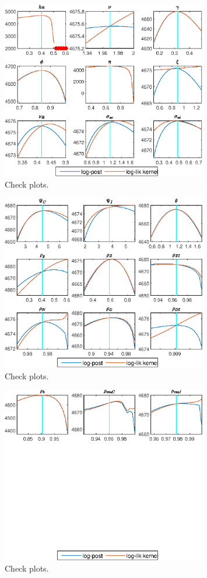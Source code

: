 \begin{figure}[H]
\centering 
\includegraphics[width=0.80\textwidth]{BRS_sectoral/graphs/BRS_sectoral_CheckPlots3}
\caption{Check plots.}\label{Fig:CheckPlots:3}
\end{figure}
 
\begin{figure}[H]
\centering 
\includegraphics[width=0.80\textwidth]{BRS_sectoral/graphs/BRS_sectoral_CheckPlots4}
\caption{Check plots.}\label{Fig:CheckPlots:4}
\end{figure}
 
\begin{figure}[H]
\centering 
\includegraphics[width=0.80\textwidth]{BRS_sectoral/graphs/BRS_sectoral_CheckPlots5}
\caption{Check plots.}\label{Fig:CheckPlots:5}
\end{figure}
 
